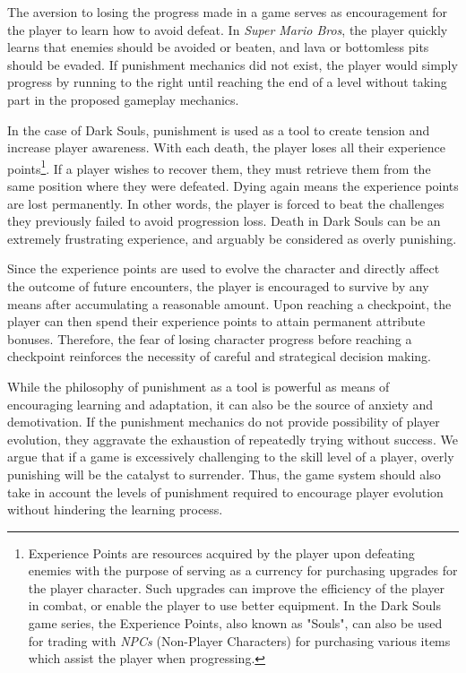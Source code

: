 \documentclass[cic,tc,english]{iiufrgs}
\begin{document}
The aversion to losing the progress made in a game serves as encouragement for the player to learn how to avoid defeat. In \emph{Super Mario Bros}, the player quickly learns that enemies should be avoided or beaten, and lava or bottomless pits should be evaded. If punishment mechanics did not exist, the player would simply progress by running to the right until reaching the end of a level without taking part in the proposed gameplay mechanics.

In the case of Dark Souls, punishment is used as a tool to create tension and increase player awareness. With each death, the player loses all their experience points\footnote{Experience Points are resources acquired by the player upon defeating enemies with the purpose of serving as a currency for purchasing upgrades for the player character. Such upgrades can improve the efficiency of the player in combat, or enable the player to use better equipment. In the Dark Souls game series, the Experience Points, also known as "Souls", can also be used for trading with \emph{NPCs} (Non-Player Characters) for purchasing various items which assist the player when progressing.}. If a player wishes to recover them, they must retrieve them from the same position where they were defeated. Dying again means the experience points are lost permanently. In other words, the player is forced to beat the challenges they previously failed to avoid progression loss. Death in Dark Souls can be an extremely frustrating experience, and arguably be considered as overly punishing.

Since the experience points are used to evolve the character and directly affect the outcome of future encounters, the player is encouraged to survive by any means after accumulating a reasonable amount. Upon reaching a checkpoint, the player can then spend their experience points to attain permanent attribute bonuses. Therefore, the fear of losing character progress before reaching a checkpoint reinforces the necessity of careful and strategical decision making.

While the philosophy of punishment as a tool is powerful as means of encouraging learning and adaptation, it can also be the source of anxiety and demotivation. If the punishment mechanics do not provide possibility of player evolution, they aggravate the exhaustion of repeatedly trying without success. We argue that if a game is excessively challenging to the skill level of a player, overly punishing will be the catalyst to surrender. Thus, the game system should also take in account the levels of punishment required to encourage player evolution without hindering the learning process.
\end{document}
